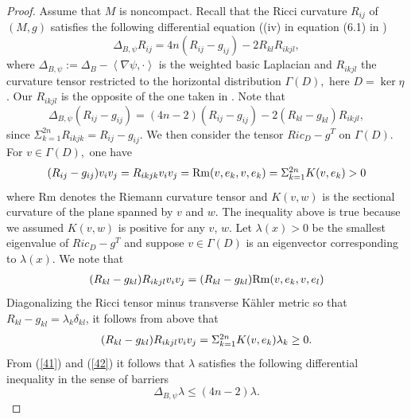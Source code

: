 \documentclass[12pt]{amsart}%
\numberwithin{equation}{section}
\begin{document}
\begin{proof}
Assume that $M$ is noncompact. Recall that the Ricci curvature $R_{ij}$ of
$(M,g)$ satisfies the following differential equation ((iv) in equation (6.1)
in \cite{cll})
\[
\Delta_{B,\psi}R_{ij}=4n(R_{ij}-g_{ij})-2R_{kl}R_{ikjl},
\]
where $\Delta_{B,\psi}:=\Delta_{B}-\left\langle \nabla\psi,\cdot\right\rangle
$ is the weighted basic Laplacian and $R_{ikjl}$ the curvature tensor
restricted to the horizontal distribution $\Gamma(D),$ here $D=\ker\eta$. Our
$R_{ikjl}$ is the opposite of the one taken in \cite{cll}. Note that
\begin{equation}
\Delta_{B,\psi}(R_{ij}-g_{ij})=(4n-2)(R_{ij}-g_{ij})-2(R_{kl}-g_{kl}%
)R_{ikjl},\label{41}%
\end{equation}
since $\Sigma_{k=1}^{2n}R_{ikjk}=R_{ij}-g_{ij}.$ We then consider the tensor
$Ric_{D}-g^{T}$ on $\Gamma(D)$. For $v\in\Gamma(D),$ one have%
\[%
\begin{array}
[c]{c}%
(R_{ij}-g_{ij})v_{i}v_{j}=R_{ikjk}v_{i}v_{j}=\mathrm{Rm}(v,e_{k}%
,v,e_{k})=\Sigma_{k=1}^{2n}K(v,e_{k})>0
\end{array}
\]
where $\mathrm{Rm}$ denotes the Riemann curvature tensor and $K(v,w)$ is the
sectional curvature of the plane spanned by $v$ and $w$. The inequality above
is true because we assumed $K(v,w)$ is positive for any $v$, $w$. Let
$\lambda(x)>0$ be the smallest eigenvalue of $Ric_{D}-g^{T}$ and suppose
$v\in\Gamma(D)$ is an eigenvector corresponding to $\lambda(x).$ We note that%
\[%
\begin{array}
[c]{c}%
(R_{kl}-g_{kl})R_{ikjl}v_{i}v_{j}=(R_{kl}-g_{kl})\mathrm{Rm}(v,e_{k},v,e_{l})
\end{array}
\]
Diagonalizing the Ricci tensor minus transverse K\"{a}hler metric so that
$R_{kl}-g_{kl}=\lambda_{k}\delta_{kl}$, it follows from above that%
\begin{equation}%
\begin{array}
[c]{c}%
(R_{kl}-g_{kl})R_{ikjl}v_{i}v_{j}=\Sigma_{k=1}^{2n}K(v,e_{k})\lambda_{k}\geq0.
\end{array}
\label{42}%
\end{equation}
From (\ref{41}) and (\ref{42}) it follows that $\lambda$ satisfies the
following differential inequality in the sense of barriers
\begin{equation}
\Delta_{B,\psi}\lambda\leq(4n-2)\lambda.\label{43}%
\end{equation}



\end{proof}
\end{document}
